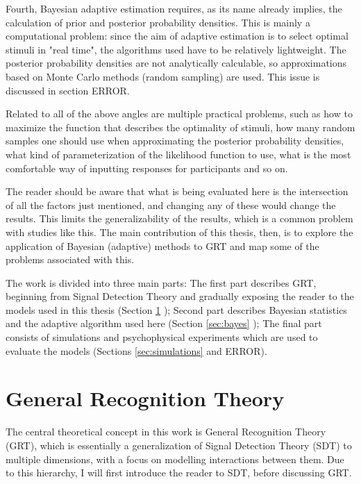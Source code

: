 \documentclass{article}\usepackage{knitr}
\begin{document}
Fourth, Bayesian adaptive estimation requires, as its name already implies, the calculation of prior and posterior probability densities. This is mainly a computational problem: since the aim of adaptive estimation is to select optimal stimuli in "real time", the algorithms used have to be relatively lightweight. The posterior probability densities are not analytically calculable, so approximations based on Monte Carlo methods (random sampling) are used. This issue is discussed in section ERROR.

Related to all of the above angles are multiple practical problems, such as how to maximize the function that describes the optimality of stimuli, how many random samples one should use when approximating the posterior probability densities, what kind of parameterization of the likelihood function to use, what is the most comfortable way of inputting responses for participants and so on. 

The reader should be aware that what is being evaluated here is the intersection of all the factors just mentioned, and changing any of these would change the results. This limits the generalizability of the results, which is a common problem with studies like this. The main contribution of this thesis, then, is to explore the application of Bayesian (adaptive) methods to GRT and map some of the problems associated with this.

The work is divided into three main parts: The first part describes GRT, beginning from Signal Detection Theory and gradually exposing the reader to the models used in this thesis (Section \ref{sec:GRT} \textit{}); Second part describes Bayesian statistics and the adaptive algorithm used here (Section \ref{sec:bayes} \textit{}); The final part consists of simulations and psychophysical experiments which are used to evaluate the models (Sections \ref{sec:simulations} \textit{} and ERROR).

\newpage


\section{General Recognition Theory}
\label{sec:GRT}

The central theoretical concept in this work is General Recognition Theory (GRT), which is essentially a generalization of Signal Detection Theory (SDT) to multiple dimensions, with a focus on modelling interactions between them. Due to this hierarchy, I will first introduce the reader to SDT, before discussing GRT.
\end{document}
